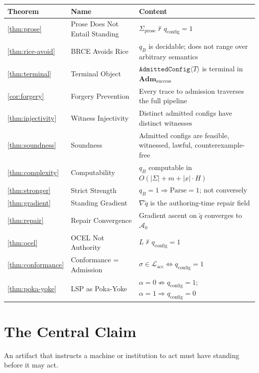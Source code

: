 \documentclass[12pt, letterpaper]{report}
\theoremstyle{plain}
\theoremstyle{definition}
\theoremstyle{remark}
\newcommand{\qc}{q_{\mathrm{config}}}
\begin{document}
\begin{center}
\renewcommand{\arraystretch}{1.5}
\begin{tabular}{@{}llp{7.5cm}@{}}
\toprule
\textbf{Theorem} & \textbf{Name} & \textbf{Content} \\
\midrule
\ref{thm:prose} & Prose Does Not Entail Standing
  & $\Sigma_{\mathrm{prose}} \not\vdash \qc = 1$ \\
\ref{thm:rice-avoid} & BRCE Avoids Rice
  & $q_B$ is decidable; does not range over arbitrary semantics \\
\ref{thm:terminal} & Terminal Object
  & $\texttt{AdmittedConfig}\langle T\rangle$ is terminal in $\mathbf{Adm}_{\mathrm{success}}$ \\
\ref{cor:forgery} & Forgery Prevention
  & Every trace to admission traverses the full pipeline \\
\ref{thm:injectivity} & Witness Injectivity
  & Distinct admitted configs have distinct witnesses \\
\ref{thm:soundness} & Soundness
  & Admitted configs are feasible, witnessed, lawful, counterexample-free \\
\ref{thm:complexity} & Computability
  & $q_B$ computable in $O(|\Sigma| + m + |x| \cdot H)$ \\
\ref{thm:stronger} & Strict Strength
  & $q_B = 1 \Rightarrow \mathrm{Parse} = 1$; not conversely \\
\ref{thm:gradient} & Standing Gradient
  & $\nabla\tilde{q}$ is the authoring-time repair field \\
\ref{thm:repair} & Repair Convergence
  & Gradient ascent on $\tilde{q}$ converges to $\mathcal{A}_0$ \\
\ref{thm:ocel} & OCEL Not Authority
  & $L \not\vdash \qc = 1$ \\
\ref{thm:conformance} & Conformance = Admission
  & $\sigma \in \mathcal{L}_{\mathrm{acc}} \iff \qc = 1$ \\
\ref{thm:poka-yoke} & LSP as Poka-Yoke
  & $\alpha = 0 \not\Rightarrow \qc = 1$; $\alpha = 1 \Rightarrow \qc = 0$ \\
\bottomrule
\end{tabular}
\end{center}

\section{The Central Claim}

An artifact that instructs a machine or institution to act
must have standing before it may act.
\end{document}
